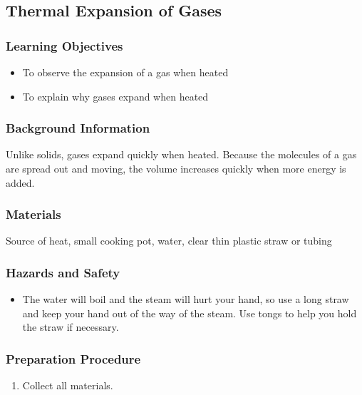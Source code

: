 \subsection{Thermal Expansion of Gases}

\subsubsection*{Learning Objectives}
\begin{itemize}
\item{To observe the expansion of a gas when heated} 
\item{To explain why gases expand when heated} 
\end{itemize}

\subsubsection*{Background Information}
Unlike solids, gases expand quickly when heated. Because the molecules of a gas are spread out and moving, the volume increases quickly when more energy is added.  

\subsubsection*{Materials}
Source of heat, small cooking pot, water, clear thin plastic straw or tubing

\subsubsection*{Hazards and Safety}
\begin{itemize}
\item{The water will boil and the steam will hurt your hand, so use a long straw and keep your hand out of the way of the steam. Use tongs to help you hold the straw if necessary.} 
\end{itemize}

\subsubsection*{Preparation Procedure}
\begin{enumerate}
\item{Collect all materials.} 
\end{enumerate}

